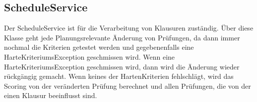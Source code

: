 \subsection{ScheduleService}\label{subsec:ScheduleService}
Der ScheduleService ist für die Verarbeitung von Klausuren zuständig.
Über diese Klasse geht jede Planungsrelevante Änderung von Prüfungen,
da dann immer nochmal die Kriterien getestet werden und gegebenenfalls
eine HarteKriteriumsException geschmissen wird.
Wenn eine HarteKriteriumsException geschmissen wird, dann wird die Änderung wieder rückgängig gemacht.
Wenn keines der HartenKriterien fehlschlägt, wird das Scoring von der veränderten Prüfung berechnet
und allen Prüfungen, die von der einen Klausur beeinflusst sind.